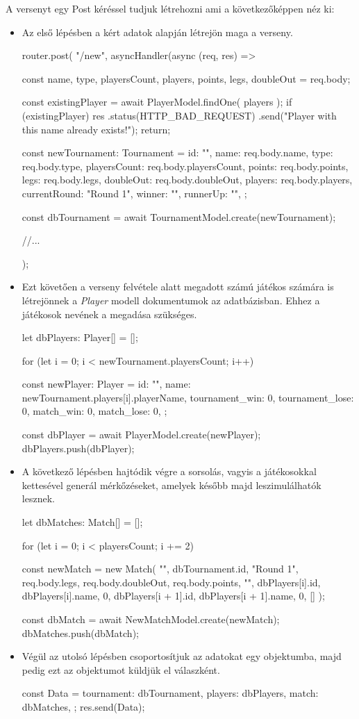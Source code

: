 A versenyt egy Post kéréssel tudjuk létrehozni ami a következőképpen néz ki:
\begin{itemize}
\item Az első lépésben a kért adatok alapján létrejön maga a verseny.
\begin{cpp}
router.post(
 "/new",
 asyncHandler(async (req, res) => {
  const {
   name, 
   type, 
   playersCount, 
   players, 
   points, 
   legs, 
   doubleOut
  } = req.body;

  const existingPlayer = await PlayerModel.findOne({ players });
    if (existingPlayer) {
      res
        .status(HTTP_BAD_REQUEST)
        .send("Player with this name already exists!");
      return;
    }

  const newTournament: Tournament = {
    id: "",
    name: req.body.name,
    type: req.body.type,
    playersCount: req.body.playersCount,
    points: req.body.points,
    legs: req.body.legs,
    doubleOut: req.body.doubleOut,
    players: req.body.players,
    currentRound: "Round 1",
    winner: "",
    runnerUp: "",
  };

  const dbTournament = await TournamentModel.create(newTournament);
  
  //...
  
 }
);
\end{cpp}
\item Ezt követően a verseny felvétele alatt megadott számú játékos számára is létrejönnek a \textit{Player} modell dokumentumok az adatbázisban. Ehhez a játékosok nevének a megadása szükséges. 
\begin{cpp}
let dbPlayers: Player[] = [];

for (let i = 0; i < newTournament.playersCount; i++) {
  const newPlayer: Player = {
    id: "",
    name: newTournament.players[i].playerName,
    tournament_win: 0,
    tournament_lose: 0,
    match_win: 0,
    match_lose: 0,
   };

    const dbPlayer = await PlayerModel.create(newPlayer);
    dbPlayers.push(dbPlayer);
}
\end{cpp}
\item A következő lépésben hajtódik végre a sorsolás, vagyis a játékosokkal kettesével generál mérkőzéseket, amelyek később majd leszimulálhatók lesznek.
\begin{cpp}
let dbMatches: Match[] = [];

for (let i = 0; i < playersCount; i += 2) {
  const newMatch = new Match(
    "",
    dbTournament.id,
    "Round 1",
    req.body.legs,
    req.body.doubleOut,
    req.body.points,
    "",
    dbPlayers[i].id,
    dbPlayers[i].name,
    0,
    dbPlayers[i + 1].id,
    dbPlayers[i + 1].name,
    0,
    []
   );

   const dbMatch = await NewMatchModel.create(newMatch);
   dbMatches.push(dbMatch);
}
\end{cpp}
\item Végül az utolsó lépésben csoportosítjuk az adatokat egy objektumba, majd pedig ezt az objektumot küldjük el válaszként.
\begin{cpp}
const Data = {
   tournament: dbTournament,
   players: dbPlayers,
   match: dbMatches,
};
res.send(Data);
\end{cpp}
\end{itemize}
